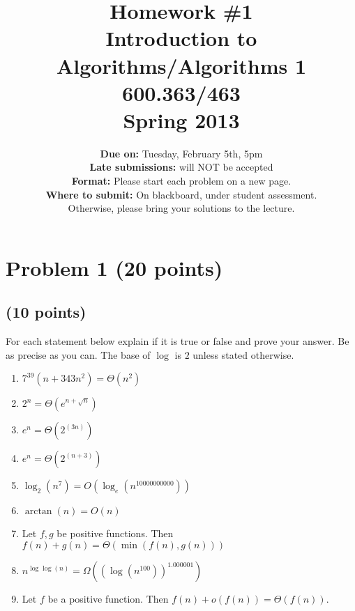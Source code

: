 \documentclass[letterpaper, 11pt]{article}
\begin{document}
\title{Homework \#1 \\ Introduction to Algorithms/Algorithms 1 \\ 600.363/463 \\ Spring 2013}
\author{\textbf{Due on:} Tuesday, February 5th, 5pm \\
\textbf{Late submissions:} will NOT be accepted\\
\textbf{Format:} Please start each problem on a new page.
\\\textbf{Where to submit:} On blackboard, under student assessment. \\
Otherwise, please bring your solutions to the lecture.
\\}


\maketitle



\section{Problem 1 (20 points)}

\subsection{(10 points)}




For each statement below explain if it is true or false and prove
your answer. Be as precise as you can. The base of $\log$ is $2$ unless stated otherwise.
\begin{enumerate}

\item  $7^{39}(n+343n^2) = \Theta(n^{2})$

\item $2^n = \Theta(e^{n+\sqrt{n}})$

\item $e^n = \Theta(2^{(3n)})$

\item $e^n = \Theta(2^{(n+3)})$


\item $\log_2(n^7) = O(\log_e(n^{10000000000}))$

\item $\arctan(n) = O(n)$

\item Let $f,g$ be positive functions. Then $f(n)+g(n) = \Theta(\min(f(n),g(n)))$

\item $n^{\log\log(n)} = \Omega(\left(\log(n^{100})\right)^{1.000001})$

\item Let $f$ be a positive function. Then $f(n)+o(f(n)) = \Theta(f(n))$.


\end{enumerate}
\end{document}
